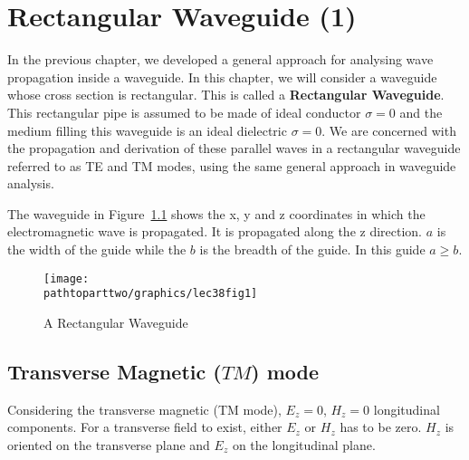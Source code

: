 \chapter{Rectangular Waveguide (1)}
In the previous chapter, we developed a general approach for analysing wave propagation inside a waveguide. In this chapter, we will consider a waveguide whose cross section is rectangular. This is called a \textbf{Rectangular Waveguide}. This rectangular pipe is assumed to be made of ideal conductor $\sigma = 0$ and the medium filling this waveguide is an ideal dielectric $\sigma = 0$. We are concerned with the propagation and derivation of these parallel waves in a rectangular waveguide referred to as TE and TM modes, using the same general approach in waveguide analysis.

The waveguide in Figure~\ref{fig:lec38fig1} shows the x, y and z coordinates in which the electromagnetic wave is propagated. It is propagated along the z direction. $a$ is the width of the guide while the $b$ is the breadth of the guide. In this guide $a \geq b$.

\begin{figure}[h]
\centering
\texttt{[image: \\pathtoparttwo/graphics/lec38fig1]}
\caption{A Rectangular Waveguide}
\label{fig:lec38fig1}
\end{figure}

\section{Transverse Magnetic ($TM$) mode}
Considering the transverse magnetic (TM mode), $ E_{z} = 0$, $H_{z} = 0 $ longitudinal components. For a transverse field to exist, either $ E_{z} $ or $ H_{z} $ has to be zero. $ H_{z} $ is oriented on the transverse plane and $ E_{z} $ on the longitudinal plane.

